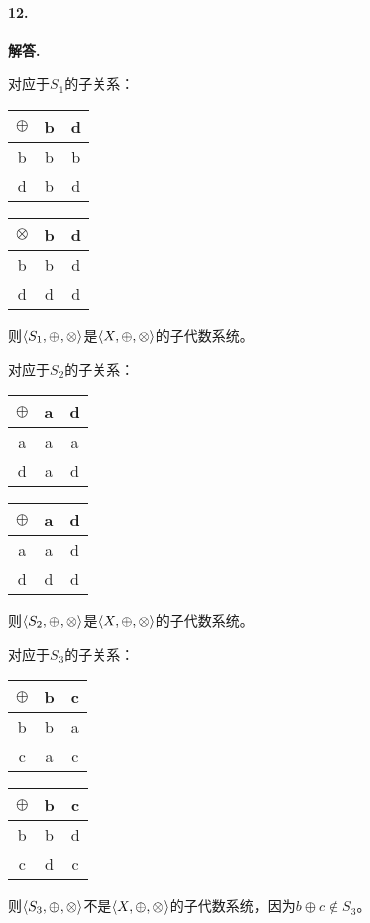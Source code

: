 \documentclass[12pt, a4paper, oneside]{ctexart}
\newenvironment{solution}{\par\noindent\textbf{解答. }}{\bigskip\par}
\begin{document}
\paragraph{12.}\begin{solution}

    对应于$S_1$的子关系：
    \begin{center}
        \begin{tabular}{c|cc}
            $\oplus$ & b & d \\ \hline
            b     & b & b \\
            d     & b & d
        \end{tabular}
        \quad\quad
        \begin{tabular}{c|cc}
            $\otimes$ & b & d \\ \hline
            b     & b & d \\
            d     & d & d
        \end{tabular}
    \end{center}

    则$\braket{S_1,\oplus,\otimes}$是$\braket{X,\oplus,\otimes}$的子代数系统。

    对应于$S_2$的子关系：
    \begin{center}
        \begin{tabular}{c|cc}
            $\oplus$ & a & d \\ \hline
            a     & a & a \\
            d     & a & d
        \end{tabular}
        \quad\quad
        \begin{tabular}{c|cc}
            $\oplus$ & a & d \\ \hline
            a     & a & d \\
            d     & d & d
        \end{tabular}
    \end{center}

    则$\braket{S_2,\oplus,\otimes}$是$\braket{X,\oplus,\otimes}$的子代数系统。

    对应于$S_3$的子关系：
    \begin{center}
        \begin{tabular}{c|cc}
            $\oplus$ & b & c \\ \hline
            b     & b & a \\
            c     & a & c
        \end{tabular}
        \quad\quad
        \begin{tabular}{c|cc}
            $\oplus$ & b & c \\ \hline
            b     & b & d \\
            c     & d & c
        \end{tabular}
    \end{center}

    则$\braket{S_3,\oplus,\otimes}$不是$\braket{X,\oplus,\otimes}$的子代数系统，因为$b\oplus c\notin S_3$。
\end{solution}
\end{document}

